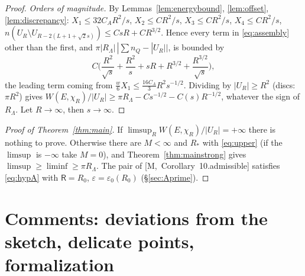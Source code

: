 \documentclass[11pt,reqno]{amsart}
\numberwithin{equation}{section}
\theoremstyle{plain}
\theoremstyle{definition}
\newcommand{\Lam}{\Lambda}
\newcommand{\fR}{\mathsf{R}}
\newcommand{\ms}[1]{\textup{[M,~#1]}}
\begin{document}
\begin{proof}
\emph{Orders of magnitude.}  By Lemmas~\ref{lem:energybound}, \ref{lem:offset}, \ref{lem:discrepancy}: $X_1\le32C_AR^2/s$, $X_2\le CR^2/s$, $X_3\le CR^2/s$, $X_4\le CR^2/s$, $n(U_R\setminus U_{R-2(L+1+\sqrt2s)})\le CsR+CR^{3/2}$.  Hence every term in \eqref{eq:assembly} other than the first, and $\pi|R_\Lam|\,|\sum n_Q-|U_R||$, is bounded by
\[
C\Big(\frac{R^2}{\sqrt s}+\frac{R^2}s+sR+R^{3/2}+\frac{R^{3/2}}{\sqrt s}\Big),
\]
the leading term coming from $\frac w6X_1\le\frac{16C_A}3R^2s^{-1/2}$.  Dividing by $|U_R|\ge R^2$ (discs: $\pi R^2$) gives $W(E,\chi_R)/|U_R|\ge\pi R_\Lam-C s^{-1/2}-C(s)R^{-1/2}$, whatever the sign of $R_\Lam$.  Let $R\to\infty$, then $s\to\infty$.
\end{proof}

\begin{proof}[Proof of Theorem~\ref{thm:main}]
If $\limsup_RW(E,\chi_R)/|U_R|=+\infty$ there is nothing to prove.  Otherwise there are $M<\infty$ and $R_*$ with \eqref{eq:upper} (if the $\limsup$ is $-\infty$ take $M=0$), and Theorem~\ref{thm:mainstrong} gives $\limsup\ge\liminf\ge\pi R_\Lam$.  The pair of \ms{Corollary~10.admissible} satisfies \eqref{eq:hypA} with $\fR=R_0$, $\varepsilon=\varepsilon_0(R_0)$ (\S\ref{sec:Aprime}).
\end{proof}

\section{Comments: deviations from the sketch, delicate points, formalization}\label{sec:comments}
\end{document}
